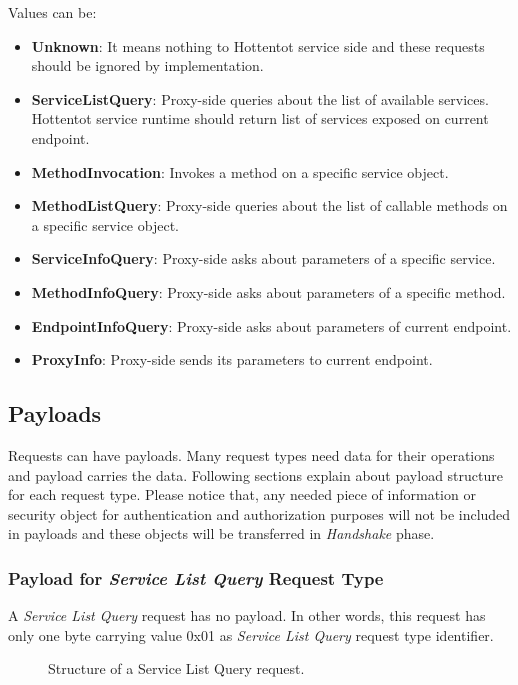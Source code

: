 \documentclass[10pt,a4paper]{article}
\begin{document}
\noindent
Values can be:
\begin{itemize}
  \item \textbf{Unknown}: It means nothing to Hottentot service side and these requests should be ignored by implementation.
  \item \textbf{ServiceListQuery}: Proxy-side queries about the list of available services. Hottentot service runtime should return list of services exposed on current endpoint.
  \item \textbf{MethodInvocation}: Invokes a method on a specific service object.
  \item \textbf{MethodListQuery}: Proxy-side queries about the list of callable methods on a specific service object.
  \item \textbf{ServiceInfoQuery}: Proxy-side asks about parameters of a specific service.
  \item \textbf{MethodInfoQuery}: Proxy-side asks about parameters of a specific method.
  \item \textbf{EndpointInfoQuery}: Proxy-side asks about parameters of current endpoint.
  \item \textbf{ProxyInfo}: Proxy-side sends its parameters to current endpoint.
\end{itemize}

\subsection {Payloads}
Requests can have payloads. Many request types need data for their operations and payload carries the data. Following sections explain about payload structure for each request type. Please notice that, any needed piece of information or security object for authentication and authorization purposes will not be included in payloads and these objects will be transferred in \textit{Handshake} phase.

\subsubsection {Payload for \textit{Service List Query} Request Type}
A \textit{Service List Query} request has no payload. In other words, this request has only one byte carrying value 0x01 as \textit{Service List Query} request type identifier.

\begin{figure}[!ht]
  \caption{Structure of a Service List Query request.}
  \centering
\end{figure}
\end{document}
